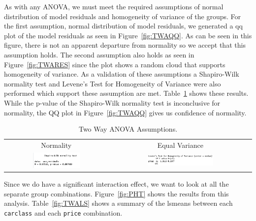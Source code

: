 \documentclass[acmsmall]{acmart}
\begin{document}
As with any ANOVA, we must meet the required assumptions of normal distribution of model residuals and homogeneity of variance of the groups. For the first assumption, normal distribution of model residuals, we generated a qq plot of the model residuals as seen in Figure~\ref{fig:TWAQQ}. As can be seen in this figure, there is not an apparent departure from normality so we accept that this assumption holds. The second assumption also holds as seen in Figure~\ref{fig:TWARES} since the plot shows a random cloud that supports homogeneity of variance. As a validation of these assumptions a Shapiro-Wilk normality test and Levene's Test for Homogeneity of Variance were also performed which support these assumption are met. Table~\ref{fig:TWAASS} shows these results. While the p-value of the Shapiro-Wilk normality test is inconclusive for normality, the QQ plot in Figure~\ref{fig:TWAQQ} gives us confidence of normality.
\begin{table}[h]
\centering
\begin{tabular}{p{} p{}}
	\hline
	\multicolumn{1}{|c|}{Normality} & \multicolumn{1}{|c|}{Equal Variance} \\
		\multicolumn{1}{|c|}{\includegraphics[width=0.48\textwidth]{../graphics/TWAshap}} &
		\multicolumn{1}{|c|}{\includegraphics[width=0.48\textwidth]{../graphics/TWALev}}\\
		\hline
	\end{tabular}		
	\caption{Two Way ANOVA Assumptions.} %
	\label{fig:TWAASS}
\end{table}
 Since we do have a significant interaction effect, we want to look at all the separate group combinations. Figure~\ref{fig:PHT} shows the results from this analysis. Table~\ref{fig:TWALS} shows a summary of the lsmeans between each \texttt{carclass} and each \texttt{price} combination. 
\end{document}
